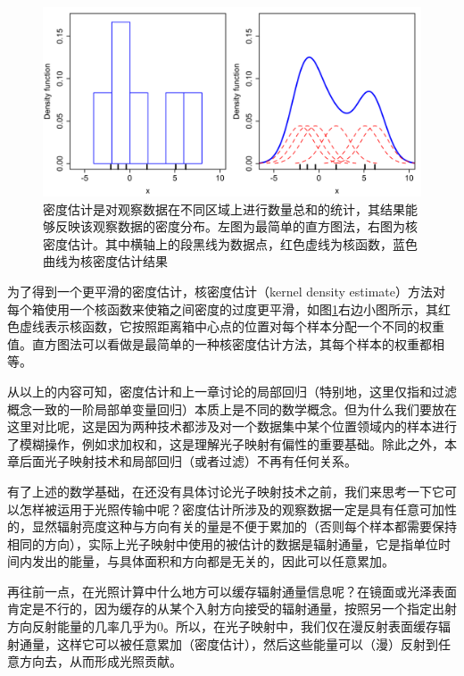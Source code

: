 \begin{figure}
\includegraphics[width=1.0\textwidth]{figures/pm/density-estimate}
\caption{密度估计是对观察数据在不同区域上进行数量总和的统计，其结果能够反映该观察数据的密度分布。左图为最简单的直方图法，右图为核密度估计。其中横轴上的段黑线为数据点，红色虚线为核函数，蓝色曲线为核密度估计结果}
\label{f:pm-density-estimate}
\end{figure}

为了得到一个更平滑的密度估计，核密度估计（kernel density estimate）方法对每个箱使用一个核函数来使箱之间密度的过度更平滑，如图\ref{f:pm-density-estimate}右边小图所示，其红色虚线表示核函数，它按照距离箱中心点的位置对每个样本分配一个不同的权重值。直方图法可以看做是最简单的一种核密度估计方法，其每个样本的权重都相等。

从以上的内容可知，密度估计和上一章讨论的局部回归（特别地，这里仅指和过滤概念一致的一阶局部单变量回归）本质上是不同的数学概念。但为什么我们要放在这里对比呢，这是因为两种技术都涉及对一个数据集中某个位置领域内的样本进行了模糊操作，例如求加权和，这是理解光子映射有偏性的重要基础。除此之外，本章后面光子映射技术和局部回归（或者过滤）不再有任何关系。

有了上述的数学基础，在还没有具体讨论光子映射技术之前，我们来思考一下它可以怎样被运用于光照传输中呢？密度估计所涉及的观察数据一定是具有任意可加性的，显然辐射亮度这种与方向有关的量是不便于累加的（否则每个样本都需要保持相同的方向），实际上光子映射中使用的被估计的数据是辐射通量，它是指单位时间内发出的能量，与具体面积和方向都是无关的，因此可以任意累加。

再往前一点，在光照计算中什么地方可以缓存辐射通量信息呢？在镜面或光泽表面肯定是不行的，因为缓存的从某个入射方向接受的辐射通量，按照另一个指定出射方向反射能量的几率几乎为0。所以，在光子映射中，我们仅在漫反射表面缓存辐射通量，这样它可以被任意累加（密度估计），然后这些能量可以（漫）反射到任意方向去，从而形成光照贡献。





